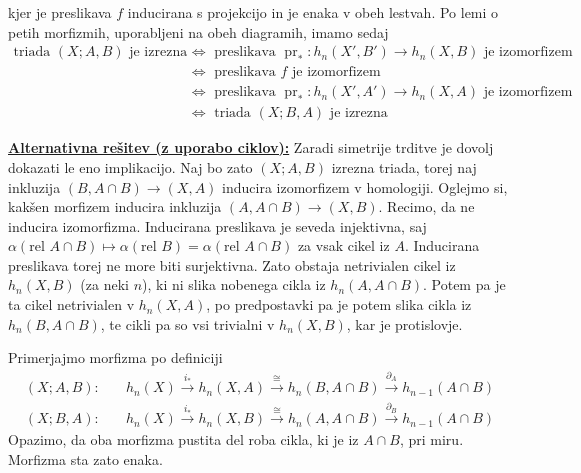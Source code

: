 \documentclass[a4paper, 12pt]{article}
\DeclareMathOperator{\pr}{pr}
\newcommand{\iso}{\cong}
\begin{document}
\begin{enumerate}[label=(\alph*)]
	 {
	}
	kjer je preslikava $f$ inducirana s projekcijo in je enaka v obeh lestvah. Po lemi o petih morfizmih, uporabljeni na obeh diagramih, imamo sedaj
	\begin{align*}
	\text{triada $(X; A, B)$ je izrezna } &\iff \text{ preslikava $\pr_* \colon h_n(X', B') \to h_n(X, B)$ je izomorfizem }\\
	&\iff \text{ preslikava $f$ je izomorfizem } \\
	&\iff \text{ preslikava $\pr_* \colon h_n(X', A') \to h_n(X, A)$ je izomorfizem } \\
	&\iff \text{ triada $(X; B, A)$ je izrezna} 
	\end{align*}
	
	\underline{\textbf{Alternativna rešitev (z uporabo ciklov):}} Zaradi simetrije trditve je dovolj dokazati le eno implikacijo. Naj bo zato $(X; A, B)$ izrezna triada, torej naj inkluzija $(B, A\cap B) \to (X, A)$ inducira izomorfizem v homologiji. Oglejmo si, kakšen morfizem inducira inkluzija $(A, A\cap B) \to (X, B)$. Recimo, da ne inducira izomorfizma. Inducirana preslikava je seveda injektivna, saj $\alpha (\text{rel } A \cap B) \mapsto \alpha (\text{rel } B) = \alpha (\text{rel } A\cap B)$ za vsak cikel iz $A$. Inducirana preslikava torej ne more biti surjektivna. Zato obstaja netrivialen cikel iz $h_n(X, B)$ (za neki $n$), ki ni slika nobenega cikla iz $h_n(A, A\cap B)$. Potem pa je ta cikel netrivialen v $h_n(X, A)$, po predpostavki pa je potem slika cikla iz $h_n(B, A\cap B)$, te cikli pa so vsi trivialni v $h_n(X, B)$, kar je protislovje.
	
	Primerjajmo morfizma po definiciji
	\begin{align*}
		(X; A, B):\quad &h_n(X) \xrightarrow{i_*} h_n(X, A) \xrightarrow{\iso} h_n(B, A\cap B) \xrightarrow{\partial_A} h_{n-1}(A\cap B) \\
		(X; B, A):\quad &h_n(X) \xrightarrow{i_*} h_n(X, B) \xrightarrow{\iso} h_n(A, A\cap B) \xrightarrow{\partial_B} h_{n-1}(A\cap B)
	\end{align*}
	Opazimo, da oba morfizma pustita del roba cikla, ki je iz $A \cap B$, pri miru. Morfizma sta zato enaka.
	

\end{enumerate}
\end{document}

